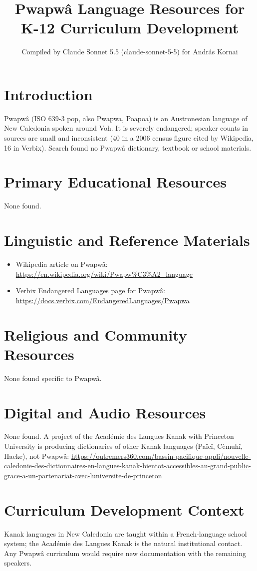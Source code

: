 \documentclass[12pt]{article}
\title{Pwapw\^a Language Resources for K-12 Curriculum Development}
\author{Compiled by Claude Sonnet 5.5 (claude-sonnet-5-5) for Andr\'as Kornai}
\date{}
\begin{document}
\maketitle
\section{Introduction}
Pwapw\^a (ISO 639-3 pop, also Pwapwa, Poapoa) is an Austronesian language of New Caledonia spoken around Voh. It is severely endangered; speaker counts in sources are small and inconsistent (40 in a 2006 census figure cited by Wikipedia, 16 in Verbix). Search found no Pwapw\^a dictionary, textbook or school materials.
\section{Primary Educational Resources}
None found.
\section{Linguistic and Reference Materials}
\begin{itemize}
\item Wikipedia article on Pwapw\^a: \url{https://en.wikipedia.org/wiki/Pwapw%C3%A2_language}
\item Verbix Endangered Languages page for Pwapw\^a: \url{https://docs.verbix.com/EndangeredLanguages/Pwapwa}
\end{itemize}
\section{Religious and Community Resources}
None found specific to Pwapw\^a.
\section{Digital and Audio Resources}
None found. A project of the Acad\'emie des Langues Kanak with Princeton University is producing dictionaries of other Kanak languages (Pa\"ic\^i, C\`emuh\^i, Haeke), not Pwapw\^a: \url{https://outremers360.com/bassin-pacifique-appli/nouvelle-caledonie-des-dictionnaires-en-langues-kanak-bientot-accessibles-au-grand-public-grace-a-un-partenariat-avec-luniversite-de-princeton}
\section{Curriculum Development Context}
Kanak languages in New Caledonia are taught within a French-language school system; the Acad\'emie des Langues Kanak is the natural institutional contact. Any Pwapw\^a curriculum would require new documentation with the remaining speakers.
\end{document}
